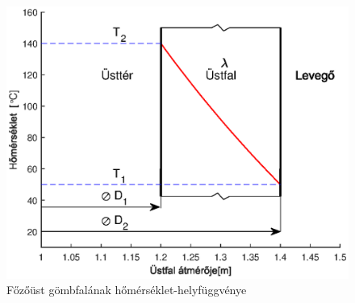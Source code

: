 \begin{figure}
	\centering
	\includegraphics{./GHKELE/HS9V}
	\caption{Főzőüst gömbfalának hőmérséklet-helyfüggvénye }
	\label{Főzőüst gömbfalának hőmérséklet-helyfüggvénye }
\end{figure}


